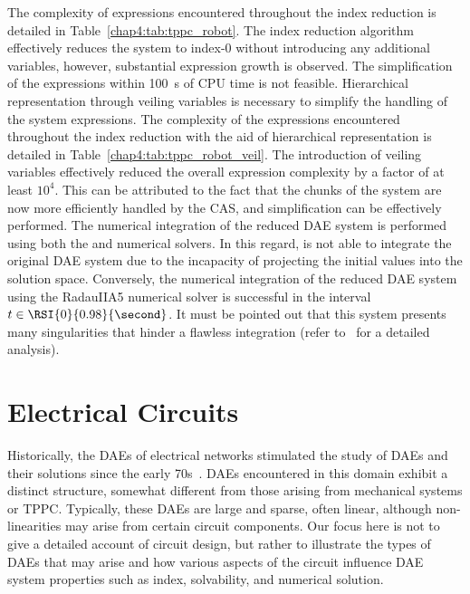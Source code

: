The complexity of expressions encountered throughout the index reduction is detailed in Table~\ref{chap4:tab:tppc_robot}. The index reduction algorithm effectively reduces the system to index-0 without introducing any additional variables, however, substantial expression growth is observed. The simplification of the expressions within \SI{100}{\second} of \ac{CPU} time is not feasible. Hierarchical representation through veiling variables is necessary to simplify the handling of the system expressions. The complexity of the expressions encountered throughout the index reduction with the aid of hierarchical representation is detailed in Table~\ref{chap4:tab:tppc_robot_veil}. The introduction of veiling variables effectively reduced the overall expression complexity by a factor of at least $10^4$. This can be attributed to the fact that the chunks of the system are now more efficiently handled by the \ac{CAS}, and simplification can be effectively performed. The numerical integration of the reduced \ac{DAE} system is performed using both the \Maple{} and \Indigo{} numerical solvers. In this regard, \Maple{} is not able to integrate the original \ac{DAE} system due to the incapacity of projecting the initial values into the solution space. Conversely, the numerical integration of the reduced \ac{DAE} system using the RadauIIA5 \Indigo{} numerical solver is successful in the interval $t \in \RSI{0}{0.98}{\second}$. It must be pointed out that this system presents many singularities that hinder a flawless integration (refer to~\cite{schwarz2020singularities} for a detailed analysis).

\section{Electrical Circuits}
\label{chap4:sec:electrical_circuits}

Historically, the \acp{DAE} of electrical networks stimulated the study of \acp{DAE} and their solutions since the early 70s~\cite{gear1971simultaneous}. \acp{DAE} encountered in this domain exhibit a distinct structure, somewhat different from those arising from mechanical systems or \ac{TPPC}. Typically, these \acp{DAE} are large and sparse, often linear, although non-linearities may arise from certain circuit components. Our focus here is not to give a detailed account of circuit design, but rather to illustrate the types of \acp{DAE} that may arise and how various aspects of the circuit influence \ac{DAE} system properties such as index, solvability, and numerical solution.

